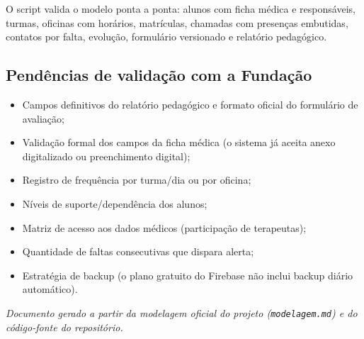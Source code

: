 \documentclass[a4paper,11pt]{article}
\begin{document}
O script valida o modelo ponta a ponta: alunos com ficha médica e responsáveis, turmas, oficinas com horários, matrículas, chamadas com presenças embutidas, contatos por falta, evolução, formulário versionado e relatório pedagógico.

\subsection{Pendências de validação com a Fundação}

\begin{itemize}[nosep]
  \item Campos definitivos do relatório pedagógico e formato oficial do formulário de avaliação;
  \item Validação formal dos campos da ficha médica (o sistema já aceita anexo digitalizado ou preenchimento digital);
  \item Registro de frequência por turma/dia ou por oficina;
  \item Níveis de suporte/dependência dos alunos;
  \item Matriz de acesso aos dados médicos (participação de terapeutas);
  \item Quantidade de faltas consecutivas que dispara alerta;
  \item Estratégia de backup (o plano gratuito do Firebase não inclui backup diário automático).
\end{itemize}

\vspace{1cm}
\begin{center}
\small\textit{Documento gerado a partir da modelagem oficial do projeto (\texttt{modelagem.md}) e do código-fonte do repositório.}
\end{center}
\end{document}
